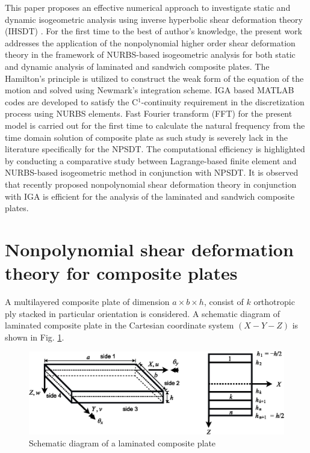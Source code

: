 \documentclass[3p,preprint,12pt]{elsarticle}
\begin{document}
This paper proposes an effective numerical approach to investigate static and dynamic isogeometric analysis using inverse hyperbolic shear deformation theory (IHSDT) \cite{grover2013new}. {\color{purple}For the first time to the best of author's knowledge, the present work addresses the application of the nonpolynomial higher order shear deformation theory in the framework of NURBS-based isogeometric analysis for both static and dynamic analysis of laminated and sandwich composite plates.} The Hamilton's principle is utilized to construct the weak form of the equation of the motion and solved using Newmark's integration scheme. IGA based MATLAB codes are developed to satisfy the C$^1$-continuity requirement in the discretization process using NURBS elements. {\color{purple}Fast Fourier transform (FFT) for the present model is carried out for the first time to calculate the natural frequency from the time domain solution of composite plate as such study is severely lack in the literature specifically for the NPSDT. The computational efficiency is highlighted by conducting a comparative study between Lagrange-based finite element and NURBS-based isogeometric method in conjunction with NPSDT.} It is observed that recently proposed nonpolynomial shear deformation theory \cite{grover2013new} in conjunction with IGA is efficient for the analysis of the laminated and sandwich composite plates.%

\section{Nonpolynomial shear deformation theory for composite plates}

A multilayered composite plate of dimension $a\times b\times h$, consist of $k$ orthotropic ply stacked in particular orientation is considered. A schematic diagram of laminated composite plate in the Cartesian coordinate system $\left(X-Y-Z\right)$ is shown in Fig. \ref{fig:LaminatedCompositePlate}.

\begin{figure}
	\graphicspath{{./All_Images/}}
	\centering
	\includegraphics[width=\linewidth]{Laminated_Plate_Final.eps}
	\caption{Schematic diagram of a laminated composite plate}
	\label{fig:LaminatedCompositePlate}
\end{figure}
\end{document}
